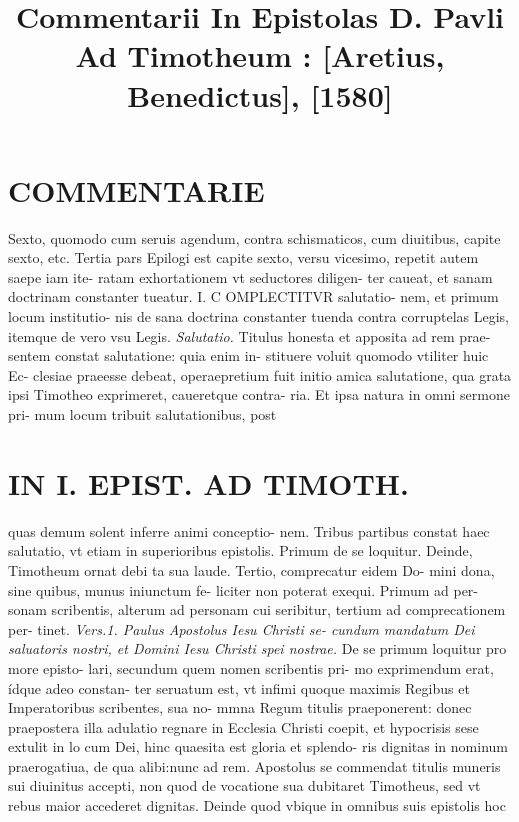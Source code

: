 \documentclass{article}
\begin{document}
\date{}
        \title{Commentarii In Epistolas D. Pavli Ad Timotheum : [Aretius, Benedictus], [1580]}
\maketitle

\begin{pages} 
\beginnumbering
        
\marginpar{[ p.8 ]}
\section*{COMMENTARIE }\pstart Sexto, quomodo cum seruis agendum, contra schismaticos, cum diuitibus, capite sexto, etc.  \pend\pstart Tertia pars Epilogi est capite sexto, versu vicesimo, repetit autem saepe iam ite- ratam exhortationem vt seductores diligen- ter caueat, et sanam doctrinam constanter tueatur.  \pendCAPVT I. \pstart C OMPLECTITVR salutatio- nem, et primum locum institutio- nis de sana doctrina constanter tuenda contra corruptelas Legis, itemque de vero vsu Legis.  \pend
\textit{Salutatio. }\pstart Titulus honesta et apposita ad rem prae- sentem constat salutatione: quia enim in- stituere voluit quomodo vtiliter huic Ec- clesiae praeesse debeat, operaepretium fuit initio amica salutatione, qua grata ipsi Timotheo exprimeret, caueretque contra- ria. Et ipsa natura in omni sermone pri- mum locum tribuit salutationibus, post  \pend
\textbf{}
\section*{IN I. EPIST. AD TIMOTH. }
\marginpar{[ p.9 ]}\pstart quas demum solent inferre animi conceptio- nem.  \pend\pstart Tribus partibus constat haec salutatio, vt etiam in superioribus epistolis. Primum de se loquitur. Deinde, Timotheum ornat debi ta sua laude. Tertio, comprecatur eidem Do- mini dona, sine quibus, munus iniunctum fe- liciter non poterat exequi. Primum ad per- sonam scribentis, alterum ad personam cui seribitur, tertium ad comprecationem per- tinet.  \pend
\textit{Vers.1. Paulus Apostolus Iesu Christi se- cundum mandatum Dei saluatoris nostri, et Domini Iesu Christi spei nostrae. }\pstart De se primum loquitur pro more episto- lari, secundum quem nomen scribentis pri- mo exprimendum erat, ídque adeo constan- ter seruatum est, vt infimi quoque maximis Regibus et Imperatoribus scribentes, sua no- mmna Regum titulis praeponerent: donec praepostera illa adulatio regnare in Ecclesia Christi coepit, et hypocrisis sese extulit in lo cum Dei, hinc quaesita est gloria et splendo- ris dignitas in nominum praerogatiua, de qua alibi:nunc ad rem. Apostolus se commendat titulis muneris sui diuinitus accepti, non quod de vocatione sua dubitaret Timotheus, sed vt rebus maior accederet dignitas. Deinde quod vbique in omnibus suis epistolis hoc  \pend
\marginpar{[ p.10 ]}

\end{pages}
\end{document}

